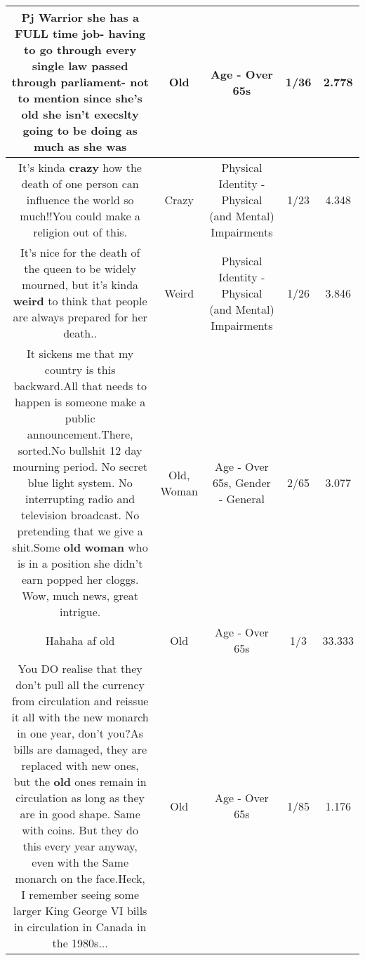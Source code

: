 \documentclass[11pt]{article}
\newlength\mylength
\begin{document}
\begin{center}
\begin{longtable}{|C{.65\mylength}|C{.30\mylength}|C{.12\mylength}|C{.12\mylength}|C{.12\mylength}|}
  \small Pj Warrior she has a FULL time job- having to go through every single law passed through parliament- not to mention since she's \textbf{old} she isn't execslty going to be doing as much as she was\normalsize   & Old & Age - Over 65s & 1/36 & 2.778 \\  \hline
  \small It's kinda \textbf{crazy} how the death of one person can influence the world so much!!You could make a religion out of this.\normalsize   & Crazy & Physical Identity - Physical (and Mental) Impairments & 1/23 & 4.348 \\  \hline
  \small It's nice for the death of the queen to be widely mourned, but it's kinda \textbf{weird} to think that people are always prepared for her death..\normalsize   & Weird & Physical Identity - Physical (and Mental) Impairments & 1/26 & 3.846 \\  \hline
  \small It sickens me that my country is this backward.All that needs to happen is someone make a public announcement.There, sorted.No bullshit 12 day mourning period. No secret blue light system. No interrupting radio and television broadcast. No pretending that we give a shit.Some \textbf{old} \textbf{woman} who is in a position she didn't earn popped her cloggs. Wow, much news, great intrigue.\normalsize   & Old, Woman & Age - Over 65s, Gender - General & 2/65 & 3.077 \\  \hline
  \small Hahaha af old\normalsize   & Old & Age - Over 65s & 1/3 & 33.333 \\  \hline
  \small You DO realise that they don't pull all the currency from circulation and reissue it all with the new monarch in one year, don't you?As bills are damaged, they are replaced with new ones, but the \textbf{old} ones remain in circulation as long as they are in good shape. Same with coins. But they do this every year anyway, even with the Same monarch on the face.Heck, I remember seeing some larger King George VI bills in circulation in Canada in the 1980s...\normalsize   & Old & Age - Over 65s & 1/85 & 1.176 \\  \hline

\end{longtable}
\end{center}
\end{document}
